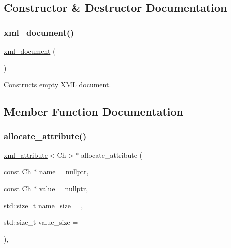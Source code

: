 \subsection{Constructor \& Destructor Documentation}
\mbox{\label{classrapidxml_1_1xml__document_a6ce266cc52d549c42abe3a3d5e8af9ba}} 
\subsubsection{\texorpdfstring{xml\+\_\+document()}{xml\_document()}}
{\footnotesize\ttfamily \mbox{\hyperlink{classrapidxml_1_1xml__document}{xml\+\_\+document}} (\begin{DoxyParamCaption}{ }\end{DoxyParamCaption})\hspace{0.3cm}{\ttfamily [inline]}}



Constructs empty X\+ML document. 



\subsection{Member Function Documentation}
\mbox{\label{classrapidxml_1_1memory__pool_aa7286aec00dac6d9af11cdc69e1e470e}} 
\subsubsection{\texorpdfstring{allocate\+\_\+attribute()}{allocate\_attribute()}}
{\footnotesize\ttfamily \mbox{\hyperlink{classrapidxml_1_1xml__attribute}{xml\+\_\+attribute}}$<$Ch$>$$\ast$ allocate\+\_\+attribute (\begin{DoxyParamCaption}\item[{const Ch $\ast$}]{name = {\ttfamily nullptr},  }\item[{const Ch $\ast$}]{value = {\ttfamily nullptr},  }\item[{std\+::size\+\_\+t}]{name\+\_\+size = {},  }\item[{std\+::size\+\_\+t}]{value\+\_\+size = {} }\end{DoxyParamCaption})\hspace{0.3cm}{\ttfamily [inline]}, {\ttfamily [inherited]}}



